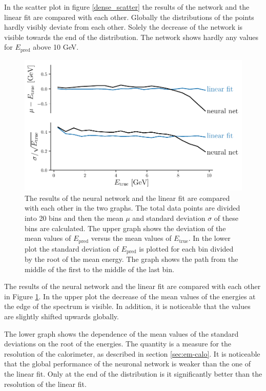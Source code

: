 \documentclass[12pt, a4paper]{thesis}
\begin{document}
In the scatter plot in figure \ref{dense_scatter} the results of the
network and the linear fit are compared with each other. Globally the
distributions of the points hardly visibly deviate from each
other. Solely the decrease of the network is visible towards the end of
the distribution.  The network shows hardly any values for
\(E_{\text{pred}}\) above 10 GeV.

\begin{figure}[hbtp]
  \centering
  \includegraphics[width=.9\linewidth]{../images/dense_res.pdf}
  \caption{ The results of the neural network and the linear fit are
    compared with each other in the two graphs. The total data points
    are divided into 20 bins and then the mean \(\mu\) and standard
    deviation \(\sigma\) of these bins are calculated. The upper graph
    shows the deviation of the mean values of \(E_{\text{pred}}\)
    versus the mean values of \(E_{\text{true}}\). In the lower plot
    the standard deviation of \(E_{\text{pred}}\) is plotted for each
    bin divided by the root of the mean energy. The graph shows
      the path from the middle of the first to the middle of the last
      bin.}
  \label{dense_res}
\end{figure} 

The results of the neural network and the linear fit are compared with
each other in Figure \ref{dense_res}. In the upper plot the decrease
of the mean values of the energies at the edge of the spectrum is
visible. In addition, it is noticeable that the values are slightly
shifted upwards globally.

The lower graph shows the dependence of the mean values of the
standard deviations on the root of the energies. The quantity is a
measure for the resolution of the calorimeter, as described in section
\ref{sec:em-calo}. It is noticeable that the global performance of the
neuronal network is weaker than the one of the linear fit. Only at the
end of the distribution is it significantly better than the resolution
of the linear fit.
\end{document}
